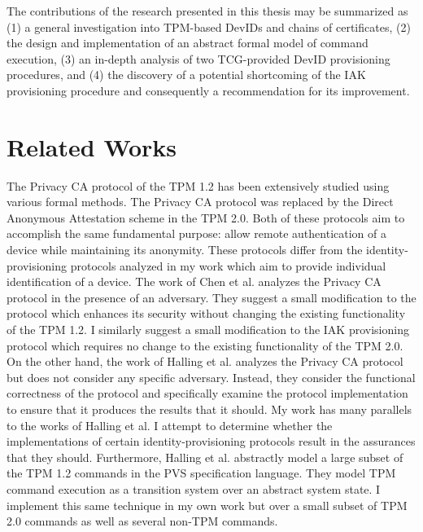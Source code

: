 The contributions of the research presented in this thesis may be summarized as (1) a general investigation into TPM-based DevIDs and chains of certificates, (2) the design and implementation of an abstract formal model of command execution, (3) an in-depth analysis of two TCG-provided DevID provisioning procedures, and (4) the discovery of a potential shortcoming of the IAK provisioning procedure and consequently a recommendation for its improvement.





\section{Related Works}


The Privacy CA protocol of the TPM 1.2 has been extensively studied using various formal methods. The Privacy CA protocol was replaced by the Direct Anonymous Attestation scheme in the TPM 2.0. Both of these protocols aim to accomplish the same fundamental purpose: allow remote authentication of a device while maintaining its anonymity. These protocols differ from the identity-provisioning protocols analyzed in my work which aim to provide individual identification of a device.
The work of Chen et al. \cite{PrivacyCAAnalysis-Chen} analyzes the Privacy CA protocol in the presence of an adversary. They suggest a small modification to the protocol which enhances its security without changing the existing functionality of the TPM 1.2. I similarly suggest a small modification to the IAK provisioning protocol which requires no change to the existing functionality of the TPM 2.0.
On the other hand, the work of Halling et al. \cite{PrivacyCAAnalysis-Hall,TPM12Model} analyzes the Privacy CA protocol but does not consider any specific adversary. Instead, they consider the functional correctness of the protocol and specifically examine the protocol implementation to ensure that it produces the results that it should.  
My work has many parallels to the works of Halling et al. 
I attempt to determine whether the implementations of certain identity-provisioning protocols result in the assurances that they should.
Furthermore, Halling et al. abstractly model a large subset of the TPM 1.2 commands in the PVS specification language. They model TPM command execution as a transition system over an abstract system state. I implement this same technique in my own work but over a small subset of TPM 2.0 commands as well as several non-TPM commands. 

